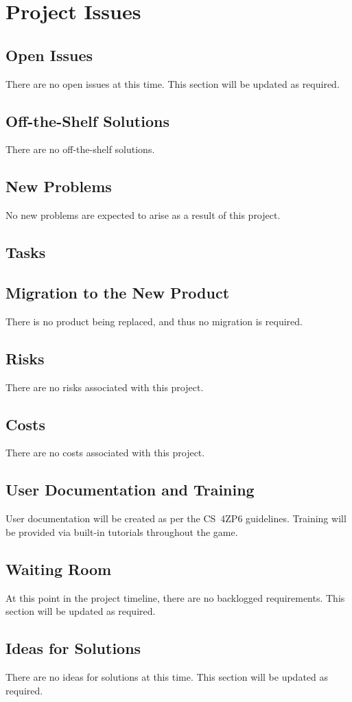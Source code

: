 \documentclass[12pt, titlepage]{article}
\begin{document}
\section{Project Issues}
\subsection{Open Issues}
There are no open issues at this time.  This section will be updated as required.
\subsection{Off-the-Shelf Solutions}
There are no off-the-shelf solutions.
\subsection{New Problems}
No new problems are expected to arise as a result of this project.
\subsection{Tasks}

\subsection{Migration to the New Product}
There is no product being replaced, and thus no migration is required.
\subsection{Risks}
There are no risks associated with this project.
\subsection{Costs}
There are no costs associated with this project.
\subsection{User Documentation and Training}
User documentation will be created as per the CS~4ZP6 guidelines.  Training will be provided via built-in tutorials throughout the game.
\subsection{Waiting Room}
At this point in the project timeline, there are no backlogged requirements.  This section will be updated as required.
\subsection{Ideas for Solutions}
There are no ideas for solutions at this time.  This section will be updated as required.
\end{document}
